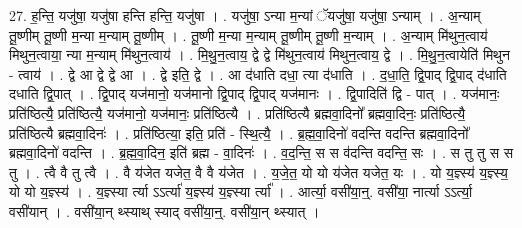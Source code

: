 \documentclass[17pt]{extarticle}
\begin{document}
27. ह॒न्ति॒ यजु॑षा॒ यजु॑षा हन्ति हन्ति॒ यजु॑षा । . यजु॑षा॒ ऽन्या म॒न्यां ॅयजु॑षा॒ यजु॑षा॒ ऽन्याम् । . अ॒न्याम् तू॒ष्णीम् तू॒ष्णी म॒न्या म॒न्याम् तू॒ष्णीम् । . तू॒ष्णी म॒न्या म॒न्याम् तू॒ष्णीम् तू॒ष्णी म॒न्याम् । . अ॒न्याम् मि॑थुन॒त्वाय॑ मिथुन॒त्वाया॒ न्या म॒न्याम् मि॑थुन॒त्वाय॑ । . मि॒थु॒न॒त्वाय॒ द्वे द्वे मि॑थुन॒त्वाय॑ मिथुन॒त्वाय॒ द्वे । . मि॒थु॒न॒त्वायेति॑ मिथुन - त्वाय॑ । . द्वे आ द्वे द्वे आ । . द्वे इति॒ द्वे । . आ द॑धाति दधा॒ त्या द॑धाति । . द॒धा॒ति॒ द्वि॒पाद् द्वि॒पाद् द॑धाति दधाति द्वि॒पात् । . द्वि॒पाद् यज॑मानो॒ यज॑मानो द्वि॒पाद् द्वि॒पाद् यज॑मानः । . द्वि॒पादिति॑ द्वि - पात् । . यज॑मानः॒ प्रति॑ष्ठित्यै॒ प्रति॑ष्ठित्यै॒ यज॑मानो॒ यज॑मानः॒ प्रति॑ष्ठित्यै । . प्रति॑ष्ठित्यै ब्रह्मवा॒दिनो᳚ ब्रह्मवा॒दिनः॒ प्रति॑ष्ठित्यै॒ प्रति॑ष्ठित्यै ब्रह्मवा॒दिनः॑ । . प्रति॑ष्ठित्या॒ इति॒ प्रति॑ - स्थि॒त्यै॒ । . ब्र॒ह्म॒वा॒दिनो॑ वदन्ति वदन्ति ब्रह्मवा॒दिनो᳚ ब्रह्मवा॒दिनो॑ वदन्ति । . ब्र॒ह्म॒वा॒दिन॒ इति॑ ब्रह्म - वा॒दिनः॑ । . व॒द॒न्ति॒ स स व॑दन्ति वदन्ति॒ सः । . स तु तु स स तु । . त्वै वै तु त्वै । . वै य॑जेत यजेत॒ वै वै य॑जेत । . य॒जे॒त॒ यो यो य॑जेत यजेत॒ यः । . यो य॒ज्ञ्स्य॑ य॒ज्ञ्स्य॒ यो यो य॒ज्ञ्स्य॑ । . य॒ज्ञ्स्या र्त्या ऽऽर्त्या॑ य॒ज्ञ्स्य॑ य॒ज्ञ्स्या र्त्या᳚ । . आर्त्या॒ वसी॑या॒न्॒. वसी॑या॒ नार्त्या ऽऽर्त्या॒ वसी॑यान् । . वसी॑या॒न् थ्स्याथ् स्याद् वसी॑या॒न्॒. वसी॑या॒न् थ्स्यात् । \newline
\end{document}
